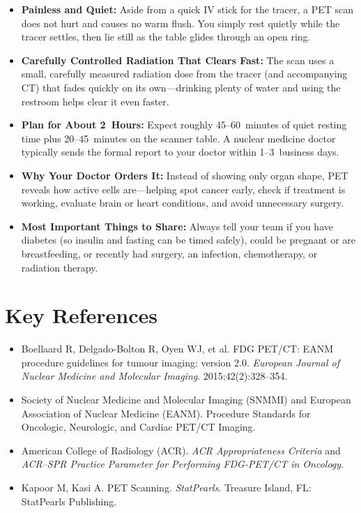\begin{itemize}
    \item \textbf{Painless and Quiet:} Aside from a quick IV stick for the tracer, a PET scan does not hurt and causes no warm flush. You simply rest quietly while the tracer settles, then lie still as the table glides through an open ring.
    \item \textbf{Carefully Controlled Radiation That Clears Fast:} The scan uses a small, carefully measured radiation dose from the tracer (and accompanying CT) that fades quickly on its own---drinking plenty of water and using the restroom helps clear it even faster.
    \item \textbf{Plan for About 2~Hours:} Expect roughly 45--60~minutes of quiet resting time plus 20--45~minutes on the scanner table. A nuclear medicine doctor typically sends the formal report to your doctor within 1--3~business days.
    \item \textbf{Why Your Doctor Orders It:} Instead of showing only organ shape, PET reveals how active cells are---helping spot cancer early, check if treatment is working, evaluate brain or heart conditions, and avoid unnecessary surgery.
    \item \textbf{Most Important Things to Share:} Always tell your team if you have diabetes (so insulin and fasting can be timed safely), could be pregnant or are breastfeeding, or recently had surgery, an infection, chemotherapy, or radiation therapy.
\end{itemize}

\section{Key References}

\begin{itemize}
    \item Boellaard R, Delgado-Bolton R, Oyen WJ, et al. FDG PET/CT: EANM procedure guidelines for tumour imaging: version 2.0. \textit{European Journal of Nuclear Medicine and Molecular Imaging}. 2015;42(2):328--354.
    \item Society of Nuclear Medicine and Molecular Imaging (SNMMI) and European Association of Nuclear Medicine (EANM). Procedure Standards for Oncologic, Neurologic, and Cardiac PET/CT Imaging.
    \item American College of Radiology (ACR). \textit{ACR Appropriateness Criteria} and \textit{ACR--SPR Practice Parameter for Performing FDG-PET/CT in Oncology}.
    \item Kapoor M, Kasi A. PET Scanning. \textit{StatPearls}. Treasure Island, FL: StatPearls Publishing.
\end{itemize}
